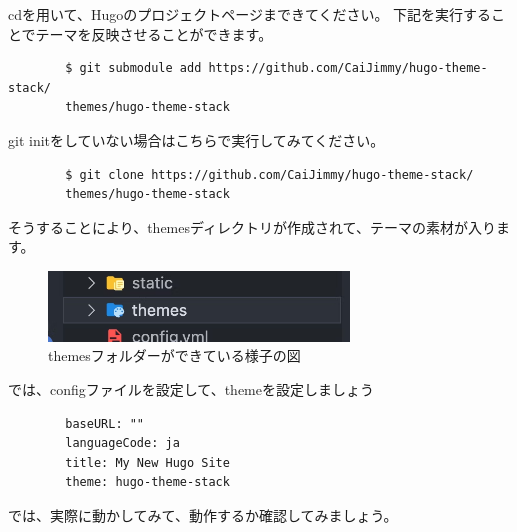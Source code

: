     cdを用いて、Hugoのプロジェクトページまできてください。
    下記を実行することでテーマを反映させることができます。

    \begin{shaded}
      \begin{verbatim}
        $ git submodule add https://github.com/CaiJimmy/hugo-theme-stack/
        themes/hugo-theme-stack
      \end{verbatim}  
    \end{shaded}

    git initをしていない場合はこちらで実行してみてください。

    \begin{shaded}
      \begin{verbatim}
        $ git clone https://github.com/CaiJimmy/hugo-theme-stack/
        themes/hugo-theme-stack
      \end{verbatim}  
    \end{shaded}
    
    そうすることにより、themesディレクトリが作成されて、テーマの素材が入ります。

    \begin{figure}[H]
      \centering
      \includegraphics[width=8cm]{./image/02-chap5/firetree-themes.png}
      \caption{themesフォルダーができている様子の図}
      \label{chap5-firetree-themes-image}
    \end{figure}

    では、configファイルを設定して、themeを設定しましょう

    \begin{tcolorbox}[breakable]
      \begin{verbatim}
        baseURL: ""
        languageCode: ja
        title: My New Hugo Site
        theme: hugo-theme-stack
      \end{verbatim}
    \end{tcolorbox}

    では、実際に動かしてみて、動作するか確認してみましょう。

